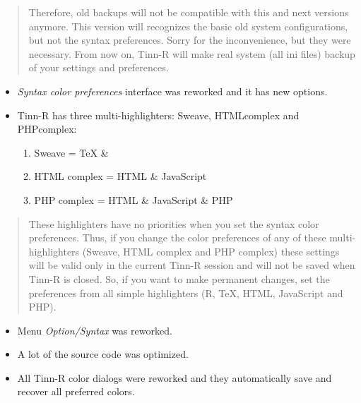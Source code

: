\begin{footnotesize}
  \begin{quotation}
    Therefore, old backups will not be compatible with this and next versions anymore.
    This version will recognizes the basic old system configurations, but not
    the syntax preferences. Sorry for the inconvenience, but they were necessary.
    From now on, Tinn-R will make real system (all ini files) backup of your
    settings and preferences.
  \end{quotation}
\end{footnotesize}

\begin{itemize}
  \item \textit{Syntax color preferences} interface was reworked and
    it has new options.
  \item Tinn-R has three multi-highlighters: Sweave, HTMLcomplex and
    PHPcomplex:
    \begin{enumerate}
      \item Sweave       = TeX  \& \RR{}
      \item HTML complex = HTML \& JavaScript
      \item PHP complex  = HTML \& JavaScript \& PHP
    \end{enumerate}
\end{itemize}

\begin{footnotesize}
  \begin{quotation}
    These highlighters have no priorities when you set the syntax color
    preferences. Thus, if you change the color preferences of any of
    these multi-highlighters (Sweave, HTML complex and PHP complex) these
    settings will be valid only in the current Tinn-R session and will
    not be saved when Tinn-R is closed. So, if you want to make permanent
    changes, set the  preferences from all simple highlighters (R, TeX,
    HTML, JavaScript and PHP).
  \end{quotation}
\end{footnotesize}

\begin{itemize}
  \item Menu \textit{Option/Syntax} was reworked.
  \item A lot of the source code was optimized.
  \item All Tinn-R color dialogs were reworked and they
    automatically save and recover all preferred colors.
\end{itemize}


